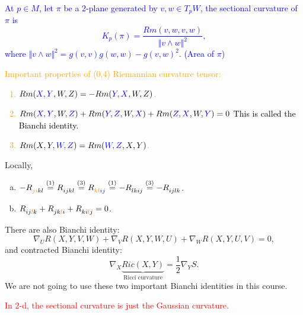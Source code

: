 \textcolor{blue}{
    \begin{definition}
        At \(p\in M\), let \(\pi\) be a 2-plane generated by \(v,w\in T_p W\),
    the sectional curvature of \(\pi\) is 
    \[
        K_p(\pi)=\frac{Rm(v,w,v,w)}{\Vert v\wedge w\Vert^2},    
    \]
    where \(\Vert v\wedge w\Vert^2=g(v,v)g(w,w)-g(v,w)^2\). (Area of 
    \(\pi\))
    \end{definition}
}

\textcolor{orange}{
    Important properties of (0,4) Riemannian curvature tensor: 
    \begin{enumerate}[(1)]
        \item \(Rm(\textcolor{blue}{X,Y},W,Z)=
        -Rm(\textcolor{blue}{Y,X},W,Z)\).
        \item \(
            Rm(\textcolor{blue}{X,Y},W,\textcolor{blue}{Z})
            +Rm(\textcolor{blue}{Y,Z},W,\textcolor{blue}{X})
            +Rm(\textcolor{blue}{Z,X},W,\textcolor{blue}{Y})
            =0
        \)
        \textcolor{black}{This is called the  
        Bianchi identity.}
        \item \(Rm(X,Y,\textcolor{blue}{W,Z})=Rm(\textcolor{blue}{W,Z}
        ,X,Y)\).
    \end{enumerate}
}
Locally, 
\begin{enumerate}[(a)]
    \item \(
    -\tensor{R}{_{\textcolor{orange}{ji}kl}}
    \overset{(1)}{=}
    \tensor{R}{_{ijkl}}
    \overset{(3)}{=}
    \tensor{R}{_{\textcolor{orange}{kl}\textcolor{blue}{ij}}}
    \overset{(1)}{=}
    -\tensor{R}{_{lkij}}
    \overset{(3)}{=}
    -\tensor{R}{_{ijlk}}
    \).
    \item \(
        \tensor{R}{_{ij\textcolor{orange}{l}k}}
        +\tensor{R}{_{jk\textcolor{orange}{l}i}}
        +\tensor{R}{_{ki\textcolor{orange}{l}j}}=0
    \).
\end{enumerate}
\begin{remark}
    There are also  Bianchi identity:
    \[
        \nabla_U R(X,Y,V,W)
        +\nabla_V R(X,Y,W,U)
        +\nabla_W R(X,Y,U,V)=0,    
    \]
    and contracted  Bianchi identity:
    \[
        \nabla_X \underbrace{Ric(X,Y)}_{\text{Ricci curvature}}
        =\frac{1}{2}\nabla_Y S.    
    \]
    We are not going to use these two important Bianchi identities
    in this course.
\end{remark}
\begin{theorem}
    \textcolor{red}{In 2-d, the sectional curvature is just the
    Gaussian curvature.}
\end{theorem}
